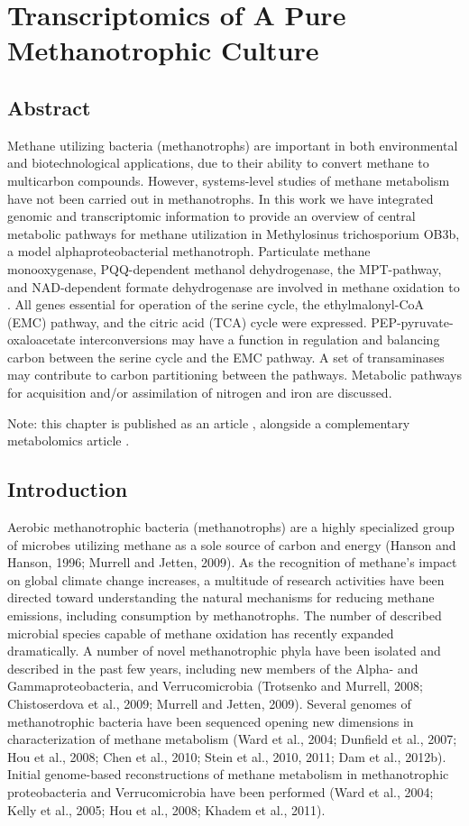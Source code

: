 \chapter{Transcriptomics of A Pure Methanotrophic Culture}
\label{chapter:A}

\section{Abstract}
Methane utilizing bacteria (methanotrophs) are important in both environmental and biotechnological applications, due to their ability to convert methane to multicarbon compounds.
However, systems-level studies of methane metabolism have not been carried out in methanotrophs.
In this work we have integrated genomic and transcriptomic information to provide an overview of central metabolic pathways for methane utilization in Methylosinus trichosporium OB3b, a model alphaproteobacterial methanotroph.
Particulate methane monooxygenase, PQQ-dependent methanol dehydrogenase, the MPT-pathway, and NAD-dependent formate dehydrogenase are involved in methane oxidation to .
All genes essential for operation of the serine cycle, the ethylmalonyl-CoA (EMC) pathway, and the citric acid (TCA) cycle were expressed.
PEP-pyruvate-oxaloacetate interconversions may have a function in regulation and balancing carbon between the serine cycle and the EMC pathway.
A set of transaminases may contribute to carbon partitioning between the pathways.
Metabolic pathways for acquisition and/or assimilation of nitrogen and iron are discussed.

Note: this chapter is published as an article \cite{matsenOB3b}, alongside a complementary metabolomics article \cite{yangOB3b}.

\section{Introduction}
Aerobic methanotrophic bacteria (methanotrophs) are a highly specialized group of microbes utilizing methane as a sole source of carbon and energy (Hanson and Hanson, 1996; Murrell and Jetten, 2009).
As the recognition of methane’s impact on global climate change increases, a multitude of research activities have been directed toward understanding the natural mechanisms for reducing methane emissions, including consumption by methanotrophs.
The number of described microbial species capable of methane oxidation has recently expanded dramatically.
A number of novel methanotrophic phyla have been isolated and described in the past few years, including new members of the Alpha- and Gammaproteobacteria, and Verrucomicrobia (Trotsenko and Murrell, 2008; Chistoserdova et al., 2009; Murrell and Jetten, 2009).
Several genomes of methanotrophic bacteria have been sequenced opening new dimensions in characterization of methane metabolism (Ward et al., 2004; Dunfield et al., 2007; Hou et al., 2008; Chen et al., 2010; Stein et al., 2010, 2011; Dam et al., 2012b).
Initial genome-based reconstructions of methane metabolism in methanotrophic proteobacteria and Verrucomicrobia have been performed (Ward et al., 2004; Kelly et al., 2005; Hou et al., 2008; Khadem et al., 2011).

